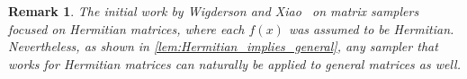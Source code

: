 \documentclass[10pt,a4paper]{article}
\newtheorem{remark}[theorem]{Remark}
\newcommand{\C}{\mathbb{C}}
\DeclareMathOperator*{\E}{\mathbb{E}}
\newcommand{\eps}{\varepsilon}
\newcommand{\1}{\mathbbm{1}}
\newcommand{\norm}[1]{\left\lVert #1\right\rVert}
\newcommand{\abs}[1]{\left|#1\right| }
\newcommand{\tuple}[1]{\left(#1\right)}
\newcommand{\zo}{\{0, 1\}}
\newcommand{\Smp}{\textup{\textsf{Samp}}}
\newcommand{\Prb}[2][]{\Pr_{#1}\left[#2\right]}
\begin{document}

\begin{remark}
    The initial work by Wigderson and Xiao~\cite{WX05} on matrix samplers focused on Hermitian matrices, where each $f(x)$ was assumed to be Hermitian. Nevertheless, as shown in \cref{lem:Hermitian_implies_general}, any sampler that works for Hermitian matrices can naturally be applied to general matrices as well.
\end{remark}
\end{document}
